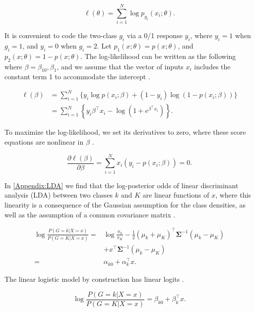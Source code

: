 \documentclass[../../../main.tex]{subfiles}
\begin{document}
\begin{equation}
\ell(\theta) = \sum_{i=1}^{N}\log p_{g_i}(x_i;\theta).
\end{equation}

It is convenient to code the two-class $g_i$ via a 0/1 response $y_i$, where $y_i=1$ when $g_i=1$, and $y_i=0$ when $g_i=2$. Let $p_1(x;\theta)=p(x;\theta)$, and $p_2(x;\theta)=1-p(x;\theta)$. The log-likelihood can be written as the following where $\beta={\beta_{10},\beta_1}$, and we assume that the vector of inputs $x_i$ includes the constant term 1 to accommodate the intercept \autocite{Hastie2009}.

\begin{equation}
\begin{split}
\ell(\beta) &= \sum_{i=1}^{N} \Big\{y_i \log p(x_i;\beta) + (1-y_i) \log (1-p(x_i;\beta))\Big\} \\
&= \sum_{i=1}^{N} \left\{y_i\beta^\top x_i - \log(1+e^{\beta^\top x_i})\right\}.
\end{split}
\end{equation}

To maximize the log-likelihood, we set its derivatives to zero, where these score equations are nonlinear in $\beta$ \autocite{Hastie2009}.

\begin{equation}
\frac{\partial\ell(\beta)}{\partial\beta} = \sum_{i=1}^{N}x_i(y_i-p(x_i;\beta))=0.
\end{equation}

In \autoref{Appendix:LDA} we find that the log-posterior odds of linear discriminant analysis (LDA) between two classes $k$ and $K$ are linear functions of $x$, where this linearity is a consequence of the Gaussian assumption for the class densities, as well as the assumption of a common covariance matrix \autocite{Hastie2009}.

\begin{equation}
\begin{split}
\log\frac{P(G=k|X=x)}{P(G=K|X=x)} = &\log\frac{\pi_k}{\pi_K}-\frac{1}{2}(\mu_k+\mu_K)^\top\bm{\Sigma}^{-1}(\mu_k-\mu_K) \\
&+x^\top\bm{\Sigma}^{-1}(\mu_k-\mu_K) \\
= &\alpha_{k0}+\alpha_k^\top x.
\end{split}
\end{equation}

The linear logistic model by construction has linear logits \autocite{Hastie2009}.

\begin{equation}
\log\frac{P(G=k|X=x)}{P(G=K|X=x)}=\beta_{k0}+\beta_k^\top x.
\end{equation}
\end{document}

